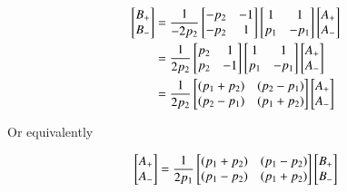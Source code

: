 \documentclass{article}
\begin{document}
\begin{align*}
\begin{bmatrix}
B_{+} \\
B_{-} 
\end{bmatrix}
&=
\frac{1}{-2p_2}
\begin{bmatrix}
-p_2 & -1 \\
-p_2 & 1
\end{bmatrix}
\begin{bmatrix}
1 & 1 \\
p_1 & -p_1
\end{bmatrix}
\begin{bmatrix}
A_{+} \\
A_{-} 
\end{bmatrix} \\
&=
\frac{1}{2p_2}
\begin{bmatrix}
p_2 & 1 \\
p_2 & -1
\end{bmatrix}
\begin{bmatrix}
1 & 1 \\
p_1 & -p_1
\end{bmatrix}
\begin{bmatrix}
A_{+} \\
A_{-} 
\end{bmatrix} \\
&=
\frac{1}{2p_2}
\begin{bmatrix}
(p_1 + p_2) & (p_2 - p_1) \\
(p_2 - p_1) & (p_1 + p_2)
\end{bmatrix}
\begin{bmatrix}
A_{+} \\
A_{-} 
\end{bmatrix} \\
\end{align*}

Or equivalently

\begin{align*}
\begin{bmatrix}
A_{+} \\
A_{-} 
\end{bmatrix}
&=
\frac{1}{2p_1}
\begin{bmatrix}
(p_1 + p_2) & (p_1 - p_2) \\
(p_1 - p_2) & (p_1 + p_2)
\end{bmatrix}
\begin{bmatrix}
B_{+} \\
B_{-} 
\end{bmatrix} \\
\end{align*}
\end{document}
